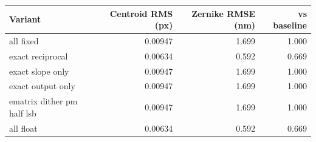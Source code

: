 \begin{tabular}{lrrr}
\hline
Variant & Centroid RMS (px) & Zernike RMSE (nm) & vs baseline \\
\hline
all fixed & 0.00947 & 1.699 & 1.000 \\
exact reciprocal & 0.00634 & 0.592 & 0.669 \\
exact slope only & 0.00947 & 1.699 & 1.000 \\
exact output only & 0.00947 & 1.699 & 1.000 \\
ematrix dither pm half lsb & 0.00947 & 1.699 & 1.000 \\
all float & 0.00634 & 0.592 & 0.669 \\
\hline
\end{tabular}
